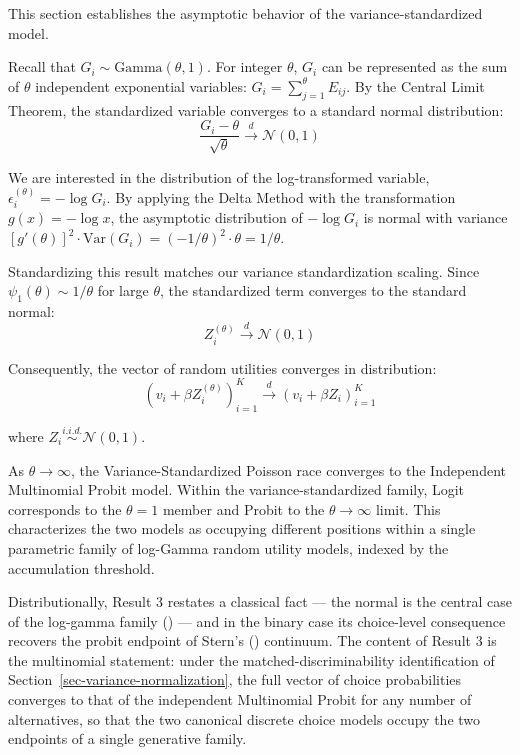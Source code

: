 \documentclass[
  man,
  floatsintext,
  longtable,
  a4paper,
  nolmodern,
  notxfonts,
  notimes,
  colorlinks=true,linkcolor=blue,citecolor=blue,urlcolor=blue]{apa7}
\begin{document}
This section establishes the asymptotic behavior of the
variance-standardized model.

Recall that \(G_i \sim \text{Gamma}(\theta, 1)\). For integer
\(\theta\), \(G_i\) can be represented as the sum of \(\theta\)
independent exponential variables: \(G_i = \sum_{j=1}^{\theta} E_{ij}\).
By the Central Limit Theorem, the standardized variable converges to a
standard normal distribution: \[
\frac{G_i - \theta}{\sqrt{\theta}} \xrightarrow{d} \mathcal{N}(0, 1)
\]

We are interested in the distribution of the log-transformed variable,
\(\epsilon_i^{(\theta)} = -\log G_i\). By applying the Delta Method with
the transformation \(g(x) = -\log x\), the asymptotic distribution of
\(-\log G_i\) is normal with variance
\([g'(\theta)]^2 \cdot \text{Var}(G_i) = (-1/\theta)^2 \cdot \theta = 1/\theta\).

Standardizing this result matches our variance standardization scaling.
Since \(\psi_1(\theta) \sim 1/\theta\) for large \(\theta\), the
standardized term converges to the standard normal: \[
Z_i^{(\theta)} \xrightarrow{d} \mathcal{N}(0, 1)
\]

Consequently, the vector of random utilities converges in distribution:
\[
(v_i + \beta Z_i^{(\theta)})_{i=1}^K \xrightarrow{d} (v_i + \beta Z_i)_{i=1}^K
\]

where \(Z_i \stackrel{i.i.d.}{\sim} \mathcal{N}(0, 1)\).

\begin{tcolorbox}[enhanced jigsaw, colframe=quarto-callout-note-color-frame, leftrule=.75mm, colbacktitle=quarto-callout-note-color!10!white, titlerule=0mm, bottomrule=.15mm, opacityback=0, rightrule=.15mm, toptitle=1mm, bottomtitle=1mm, breakable, title={Result 3 (Probit Limit)}, arc=.35mm, coltitle=black, opacitybacktitle=0.6, left=2mm, toprule=.15mm, colback=white]

As \(\theta \to \infty\), the Variance-Standardized Poisson race
converges to the Independent Multinomial Probit model. Within the
variance-standardized family, Logit corresponds to the \(\theta=1\)
member and Probit to the \(\theta \to \infty\) limit. This characterizes
the two models as occupying different positions within a single
parametric family of log-Gamma random utility models, indexed by the
accumulation threshold.

\end{tcolorbox}

Distributionally, Result 3 restates a classical fact --- the normal is
the central case of the log-gamma family
() --- and in
the binary case its choice-level consequence recovers the probit
endpoint of Stern's
() continuum.
The content of Result 3 is the multinomial statement: under the
matched-discriminability identification of
Section~\ref{sec-variance-normalization}, the full vector of choice
probabilities converges to that of the independent Multinomial Probit
for any number of alternatives, so that the two canonical discrete
choice models occupy the two endpoints of a single generative family.
\end{document}
